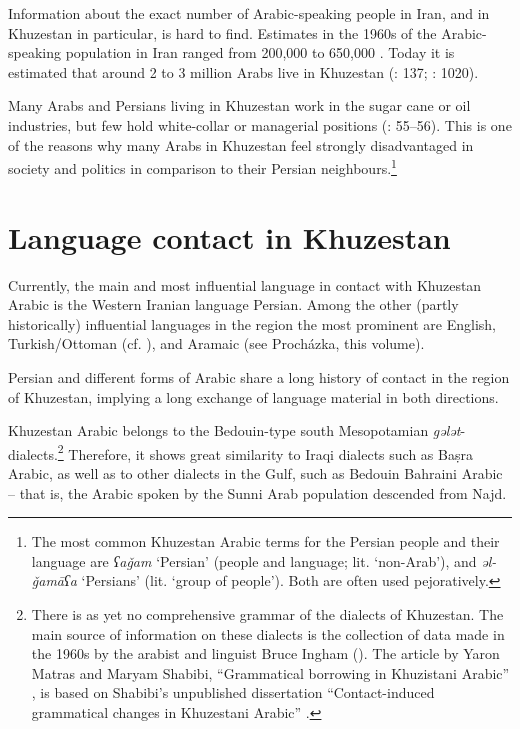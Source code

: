 \documentclass[output=paper,nonflat]{langsci/langscibook}
\begin{document}
Information about the exact number of Arabic-speaking people in Iran, and in Khuzestan in particular, is hard to find. Estimates in the 1960s of the Arabic-speaking population in Iran ranged from 200,000 to 650,000 \citep[216]{Oberling1986}. Today it is estimated that around 2 to 3 million Arabs live in Khuzestan (\citealt{MatrasShabibi2007}: 137; \citealt{Gazsi2011}: 1020). 

Many Arabs and Persians living in Khuzestan work in the sugar cane or oil industries, but few hold white-collar or managerial positions (\citealt{DePlanhol1986}: 55–56). This is one of the reasons why many Arabs in Khuzestan feel strongly disadvantaged in society and politics in comparison to their Persian neighbours.\footnote{The most common Khuzestan Arabic terms for the Persian people and their language are \textit{ʕaǧam} ‘Persian' (people and language; lit. `non-Arab'), and \textit{əl-ǧamāʕa} ‘Persians’ (lit. `group of people'). Both are often used pejoratively.} 

\section{Language contact in Khuzestan}

Currently, the main and most influential language in contact with Khuzestan Arabic is the Western Iranian language Persian. Among the other (partly historically) influential languages in the region the most prominent are English, Turkish/Ottoman (cf. \citealt{Ingham2005}), and Aramaic (see Procházka, this volume).

Persian and different forms of Arabic share a long history of contact in the region of Khuzestan, implying a long exchange of language material in both directions. 

Khuzestan Arabic belongs to the Bedouin-type south Mesopotamian \textit{gələt}-dialects.\footnote{There is as yet no comprehensive grammar of the dialects of Khuzestan. The main source of information on these dialects is the collection of data made in the 1960s by the arabist and linguist Bruce Ingham (\citeyear{Ingham1973,Ingham1976,Ingham2011khuz}). The article by Yaron Matras and Maryam Shabibi, “Grammatical borrowing in Khuzistani Arabic” \citep{MatrasShabibi2007}, is based on Shabibi’s unpublished dissertation “Contact-induced grammatical changes in Khuzestani Arabic” \citep{Shabibi2006}.} Therefore, it shows great similarity to Iraqi dialects such as Baṣra Arabic, as well as to other dialects in the Gulf, such as Bedouin Bahraini Arabic – that is, the Arabic spoken by the Sunni Arab population descended from Najd. 
\end{document}
